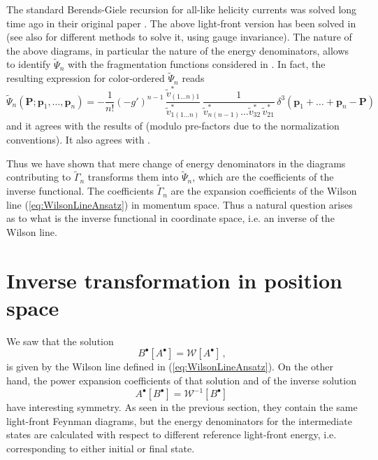 \documentclass[english,american]{article}
\begin{document}
\noindent The standard Berends-Giele recursion for all-like helicity currents 
was solved long time ago in their original paper \citep{Berends:1987me}.
The above light-front version has been solved in \citep{Motyka2009}
(see also \citep{Cruz-Santiago2015,Kotko2016} for different methods
to solve it, using gauge invariance). The nature of the above diagrams, in particular the
nature of the energy denominators, allows to identify $\tilde{\Psi}_{n}$
with the fragmentation functions considered in \citep{Motyka2009}.
In fact, the resulting expression for color-ordered $\tilde{\Psi}_{n}$
reads 
\begin{equation}
\tilde{\Psi}_{n}\left(\mathbf{P};\mathbf{p}_{1},\dots,\mathbf{p}_{n}\right)=-\frac{1}{n!}\left(-g'\right)^{n-1}\,\frac{\tilde{v}_{\left(1\dots n\right)1}^{*}}{\tilde{v}_{1\left(1\dots n\right)}^{*}}\,\frac{1}{\tilde{v}_{n\left(n-1\right)}^{*}\dots\tilde{v}_{32}^{*}\,\tilde{v}_{21}^{*}}\,\delta^{3}\left(\mathbf{p}_{1}+\dots+\mathbf{p}_{n}-\mathbf{P}\right)\,\label{eq:Psi_n_sol-color_ordered}
\end{equation}
and it agrees with the results of \citep{Motyka2009} (modulo pre-factors
due to the normalization conventions). It also agrees with \citep{Ettle2006b}. 

Thus we have shown that mere change of energy denominators in the
diagrams contributing to $\tilde{\Gamma}_{n}$ transforms them into
$\tilde{\Psi}_{n}$, which are the coefficients of the inverse functional.
The coefficients $\tilde{\Gamma}_{n}$ are the expansion coefficients of the  Wilson line (\ref{eq:WilsonLineAnsatz}) in momentum space.  Thus a natural question arises as to what is the   inverse functional in coordinate space, i.e. an inverse of the Wilson line. 

\section{Inverse transformation in position space}

\label{sec:Inverse_transf}

We saw that the solution 
\begin{equation}
B^{\bullet}\left[A^{\bullet}\right]=\mathcal{W}\left[A^{\bullet}\right]\,,\label{eq:Functional_W}
\end{equation}
 is given by the Wilson line defined in (\ref{eq:WilsonLineAnsatz}).
On the other hand, the power expansion coefficients of that solution
and of the inverse solution 
\begin{equation}
A^{\bullet}\left[B^{\bullet}\right]=\mathcal{W}^{-1}\left[B^{\bullet}\right]\,\label{eq:functional_Winv}
\end{equation}
have interesting symmetry. As seen in the previous section, they contain
the same light-front Feynman diagrams, but the energy denominators for the intermediate states
are calculated with respect to different reference light-front energy, i.e. corresponding to either initial or final state.
\end{document}
